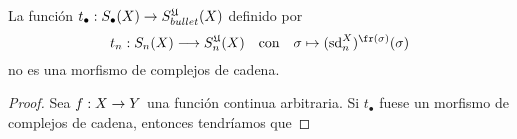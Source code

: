 \begin{ejercicio}\label{ej:73}
  La funci\'on $t_{\bullet}:S_{\bullet}(X)\rightarrow S_{bullet}^{\mathfrak{U}}(X)$ definido por
  \[
    t_n:S_n(X)\lra S_n^{\fU}(X) \quad\text{con}\quad
    \sigma\mapsto (\text{sd}^X_n)^{\fr(\sigma)}(\sigma)
  \]
  no es una morfismo de complejos de cadena.
\end{ejercicio}
\begin{proof}%
  Sea $f:X\rightarrow Y$ una funci\'on continua arbitraria. Si $t_{\bullet}$ fuese un
  morfismo de complejos de cadena, entonces tendr\'iamos que
\end{proof}%

